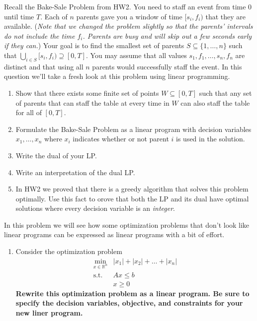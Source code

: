 \documentclass[11pt]{article}
\newcommand{\R}{\mathbb{R}}
\theoremstyle{definition}
\begin{document}
\begin{enumerate}[leftmargin=0pt]
\problemitem
Recall the Bake-Sale Problem from HW2.  You need to staff an event from time $0$ until time $T$.  Each of $n$ parents gave you a window of time $[s_i,f_i)$ that they are available.  (\emph{Note that we changed the problem slightly so that the parents' intervals do not include the time $f_i$.  Parents are busy and will skip out a few seconds early if they can.})  Your goal is to find the smallest set of parents $S \subseteq \{1,\dots,n\}$ such that $\bigcup_{i \in S} [s_i, f_i) \supseteq [0,T]$.  You may assume that all values $s_1,f_1,\dots,s_n,f_n$ are distinct and that using all $n$ parents would successfully staff the event.  In this question we'll take a fresh look at this problem using linear programming.

\begin{enumerate}[leftmargin=0pt, itemsep=1ex]
    \item Show that there exists some finite set of points $W \subseteq [0,T]$ such that any set of parents that can staff the table at every time in $W$ can also staff the table for all of $[0,T]$.
    
    \item Formulate the Bake-Sale Problem as a linear program with decision variables $x_1,\dots,x_n$ where $x_i$ indicates whether or not parent $i$ is used in the solution.
    
    \item Write the dual of your LP.
    
    \item Write an interpretation of the dual LP.
    
    \item In HW2 we proved that there is a greedy algorithm that solves this problem optimally.  Use this fact to orove that both the LP and its dual have optimal solutions where every decision variable is an \emph{integer}.
\end{enumerate}

\problemitem
In this problem we will see how some optimization problems that don't look like linear programs can be expressed as linear programs with a bit of effort.
\begin{enumerate}[leftmargin=0pt, itemsep=1ex]
    \item Consider the optimization problem
    \begin{align*}
    \min_{x \in \R^n}   &|x_1|+|x_2|+\dots+|x_n| \\
    \text{s.t. }        &Ax \leq b\\
                        &x \geq 0
    \end{align*}
    {\bfseries Rewrite this optimization problem as a linear program.  Be sure to specify the decision variables, objective, and constraints for your new liner program.}


\end{enumerate}
\end{enumerate}
\end{document}

